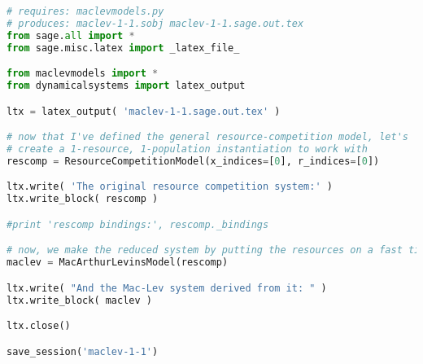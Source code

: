 \begin{lstlisting}[language=Python]
# requires: maclevmodels.py
# produces: maclev-1-1.sobj maclev-1-1.sage.out.tex
from sage.all import * 
from sage.misc.latex import _latex_file_

from maclevmodels import *
from dynamicalsystems import latex_output

ltx = latex_output( 'maclev-1-1.sage.out.tex' )

# now that I've defined the general resource-competition model, let's
# create a 1-resource, 1-population instantiation to work with
rescomp = ResourceCompetitionModel(x_indices=[0], r_indices=[0])

ltx.write( 'The original resource competition system:' )
ltx.write_block( rescomp )

#print 'rescomp bindings:', rescomp._bindings

# now, we make the reduced system by putting the resources on a fast timescale
maclev = MacArthurLevinsModel(rescomp)

ltx.write( "And the Mac-Lev system derived from it: " )
ltx.write_block( maclev )

ltx.close()

save_session('maclev-1-1')
\end{lstlisting}
